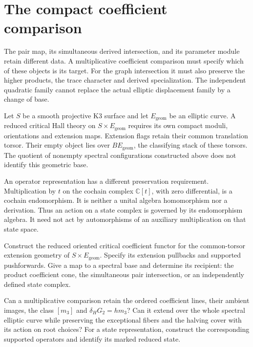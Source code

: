 \section{The compact coefficient comparison}
\label{ei:sec:comparison}

The pair map, its simultaneous derived intersection, and its
parameter module retain different data. A multiplicative coefficient
comparison must specify which of these objects is its target.
For the graph intersection it must also preserve the higher products,
the trace character and derived specialization.
The independent quadratic family cannot replace the actual elliptic
displacement family by a change of base.

Let $S$ be a smooth projective K3 surface and let
$E_{\mathrm{geom}}$ be an elliptic curve.
A reduced critical Hall theory on $S\times E_{\mathrm{geom}}$
requires its own compact moduli, orientations and extension maps.
Extension flags retain their common translation torsor.
Their empty object lies over $BE_{\mathrm{geom}}$,
the classifying stack of these torsors.
The quotient of nonempty spectral configurations constructed above
does not identify this geometric base.

An operator representation has a different preservation requirement.
Multiplication by $t$ on the cochain complex $\mathbb C[t]$, with
zero differential, is a cochain endomorphism.
It is neither a unital algebra homomorphism nor a derivation.
Thus an action on a state complex is governed by its endomorphism
algebra. It need not act by automorphisms of an auxiliary
multiplication on that state space.

\begin{question}\label{ei:qn:compact}
Construct the reduced oriented critical coefficient functor for
the common-torsor extension geometry of $S\times E_{\mathrm{geom}}$.
Specify its extension pullbacks and supported pushforwards.
Give a map to a spectral base and determine its recipient:
the product coefficient cone, the simultaneous pair intersection,
or an independently defined state complex.

Can a multiplicative comparison retain the ordered coefficient lines,
their ambient images, the class $[m_3]$ and
$\delta_HG_2=hm_3$? Can it extend over the whole spectral elliptic
curve while preserving the exceptional fibers and the halving cover
with its action on root choices?
For a state representation, construct the corresponding supported
operators and identify its marked reduced state.
\end{question}

